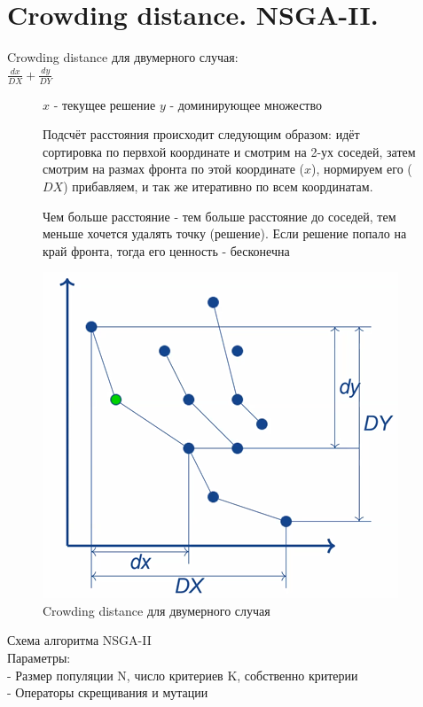\section{Crowding distance. NSGA-II.}
Crowding distance для двумерного случая:\\
$\frac{dx}{DX} + \frac{dy}{DY}$
\begin{figure}[!ht]
$x$ - текущее решение
$y$ - доминирующее множество 

Подсчёт расстояния происходит следующим образом: идёт сортировка по первхой координате и смотрим на 2-ух соседей, затем смотрим на размах фронта по этой координате ($x$), нормируем его ($DX$) прибавляем, и так же итеративно по всем координатам.

Чем больше расстояние - тем больше расстояние до соседей, тем меньше хочется удалять точку (решение). Если решение попало на край фронта, тогда его ценность - бесконечна
\begin{center}
    \includegraphics[width=0.8\linewidth]{images/Crowding_distance.PNG}
    \caption{Crowding distance для двумерного случая}
    \label{fig:mpr}
    
\end{center}
\end{figure}

Схема алгоритма NSGA-II\\

Параметры:\\
- Размер популяции N, число критериев K, собственно критерии\\
- Операторы скрещивания и мутации\\

